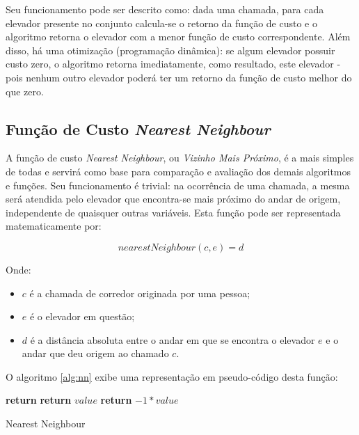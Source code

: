 Seu funcionamento pode ser descrito como: dada uma chamada, para cada elevador
presente no conjunto calcula-se o retorno da função de custo e o algoritmo
retorna o elevador com a menor função de custo correspondente. Além disso, há
uma otimização (programação dinâmica): se algum elevador possuir custo zero, o
algoritmo retorna imediatamente, como resultado, este elevador - pois nenhum
outro elevador poderá ter um retorno da função de custo melhor do que zero.

\subsection{\label{sec:ai:nn}Função de Custo \textit{Nearest Neighbour}}

A função de custo \textit{Nearest Neighbour}, ou \textit{Vizinho Mais Próximo},
é a mais simples de todas e servirá como base para comparação e avaliação dos
demais algoritmos e funções. Seu funcionamento é trivial: na ocorrência de uma
chamada, a mesma será atendida pelo elevador que encontra-se mais próximo do
andar de origem, independente de quaisquer outras variáveis. Esta função pode
ser representada matematicamente por:

\[nearestNeighbour(c, e) = d\]

Onde:
\begin{itemize}
\item \textbf{$c$} é a chamada de corredor originada por uma pessoa;
\item \textbf{$e$} é o elevador em questão;
\item \textbf{$d$} é a distância absoluta entre o andar em que se
encontra o elevador $e$ e o andar que deu origem ao chamado $c$.
\end{itemize}

O algoritmo \ref{alg:nn} exibe uma representação em pseudo-código desta função:

\begin{algorithm}[htb]
\begin{center}
\begin{algorithmic}[1]
  \State \textbf{return} 
\EndFunction
\Statex
{}
    \State \textbf{return} $value$
  \EndIf
  \State \textbf{return} $-1 * value$
\EndFunction
\end{algorithmic}
\end{center}
\caption
   {\label{alg:nn}Nearest Neighbour}
\end{algorithm}

